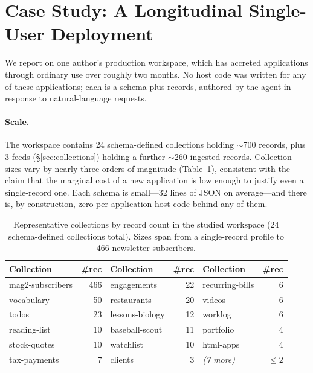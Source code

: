 \documentclass[11pt]{article}
\begin{document}
\section{Case Study: A Longitudinal Single-User Deployment}
\label{sec:casestudy}

We report on one author's production workspace, which has accreted applications
through ordinary use over roughly two months. No host code was written for any of
these applications; each is a schema plus records, authored by the agent in
response to natural-language requests.

\paragraph{Scale.}
The workspace contains 24 schema-defined collections holding $\sim$700 records,
plus 3 feeds (\S\ref{sec:collections}) holding a further $\sim$260 ingested
records. Collection sizes vary by nearly three orders of magnitude
(Table~\ref{tab:collections}), consistent with the claim that the marginal cost of
a new application is low enough to justify even a single-record one. Each schema is
small---32 lines of JSON on average---and there is, by construction, zero
per-application host code behind any of them.

\begin{table}[t]
\centering
\small
\begin{tabular}{@{}lr lr lr@{}}
\toprule
Collection & \#rec & Collection & \#rec & Collection & \#rec \\
\midrule
mag2-subscribers & 466 & engagements & 22 & recurring-bills & 6 \\
vocabulary       & 50  & restaurants & 20 & videos          & 6 \\
todos            & 23  & lessons-biology & 12 & worklog      & 6 \\
reading-list     & 10  & baseball-scout  & 11 & portfolio    & 4 \\
stock-quotes     & 10  & watchlist       & 10 & html-apps    & 4 \\
tax-payments     & 7   & clients         & 3  & \emph{(7 more)} & $\le 2$ \\
\bottomrule
\end{tabular}
\caption{Representative collections by record count in the studied workspace
(24 schema-defined collections total). Sizes span from a single-record profile to
466 newsletter subscribers.}
\label{tab:collections}
\end{table}
\end{document}
